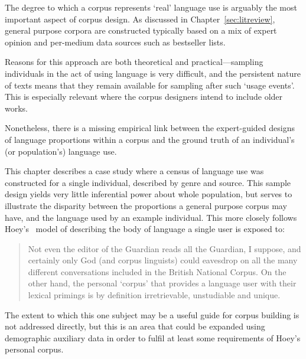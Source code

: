 The degree to which a corpus represents `real' language use is arguably the most important aspect of corpus design.  As discussed in Chapter~\ref{sec:litreview}, general purpose corpora are constructed typically based on a mix of expert opinion and per-medium data sources such as bestseller lists.


Reasons for this approach are both theoretical and practical---sampling individuals in the act of using language is very difficult, and the persistent nature of texts means that they remain available for sampling after such `usage events'.  This is especially relevant where the corpus designers intend to include older works.

Nonetheless, there is a missing empirical link between the expert-guided designs of language proportions within a corpus and the ground truth of an individual's (or population's) language use.

This chapter describes a case study where a census of language use was constructed for a single individual, described by genre and source.  This sample design yields very little inferential power about whole population, but serves to illustrate the disparity between the proportions a general purpose corpus may have, and the language used by an example individual.  This more closely follows Hoey's~\cite[p.14]{hoey2005lexical} model of describing the body of language a single user is exposed to:

\begin{quote}
Not even the editor of the Guardian reads all the Guardian, I suppose, and certainly only God (and corpus linguists) could eavesdrop on all the many different conversations included in the British National Corpus.  On the other hand, the personal `corpus' that provides a language user with their lexical primings is by definition irretrievable, unstudiable and unique.
\end{quote}

The extent to which this one subject may be a useful guide for corpus building is not addressed directly, but this is an area that could be expanded using demographic auxiliary data in order to fulfil at least some requirements of Hoey's personal corpus.

